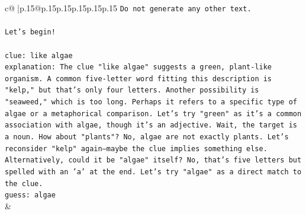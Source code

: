 \documentclass{article}
\begin{document}
{\begin{supertabular}{c@{$\;$}|p{.15\linewidth}@{}p{.15\linewidth}p{.15\linewidth}p{.15\linewidth}p{.15\linewidth}p{.15\linewidth}}
{{{\texttt{Do not generate any other text.} \\
\\ 
\texttt{Let's begin!} \\
\\ 
\texttt{clue: like algae} \\
\texttt{explanation: The clue "like algae" suggests a green, plant{-}like organism. A common five{-}letter word fitting this description is "kelp," but that's only four letters. Another possibility is "seaweed," which is too long. Perhaps it refers to a specific type of algae or a metaphorical comparison. Let's try "green" as it's a common association with algae, though it's an adjective. Wait, the target is a noun. How about "plants"? No, algae are not exactly plants. Let's reconsider "kelp" again—maybe the clue implies something else. Alternatively, could it be "algae" itself? No, that's five letters but spelled with an 'a' at the end. Let's try "algae" as a direct match to the clue.} \\
\texttt{guess: algae} \\
            }
        }
    }
    & \\ \\


\end{supertabular}}
\end{document}
